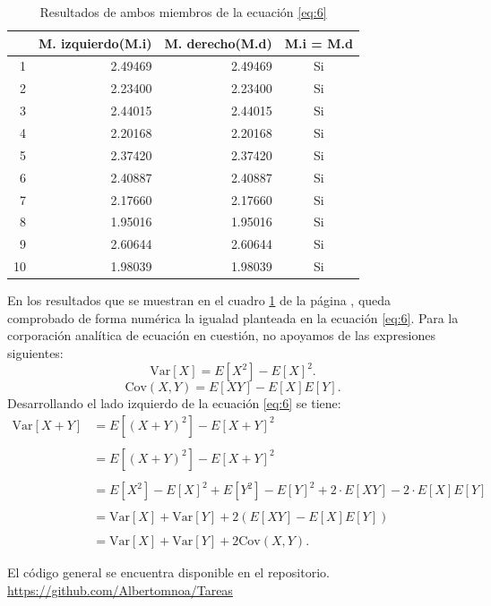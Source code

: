 \documentclass{article}
\begin{document}
\begin{table}[H]
  \centering
  \caption{Resultados de ambos miembros de la ecuación \ref{eq:6}}
    \begin{tabular}{rrrc}
    \toprule
          & \multicolumn{1}{l}{M. izquierdo(M.i)} & \multicolumn{1}{l}{M. derecho(M.d)} & \multicolumn{1}{l}{M.i  =  M.d} \\
    \midrule
    1     & 2.49469 & 2.49469 & Si \\
    2     & 2.23400 & 2.23400 & Si \\
    3     & 2.44015 & 2.44015 & Si \\
    4     & 2.20168 & 2.20168 & Si \\
    5     & 2.37420 & 2.37420 & Si \\
    6     & 2.40887 & 2.40887 & Si \\
    7     & 2.17660 & 2.17660 & Si \\
    8     & 1.95016 & 1.95016 & Si \\
    9     & 2.60644 & 2.60644 & Si \\
    10    & 1.98039 & 1.98039 & Si \\
    \bottomrule
    \end{tabular}%
  \label{tab:3}%
\end{table}%
En los resultados que se muestran en el cuadro \ref{tab:3} de la página \pageref{tab:3}, queda comprobado de forma numérica la igualad planteada en la ecuación \ref{eq:6}. Para la corporación analítica de ecuación en cuestión, no apoyamos de las expresiones siguientes:
\begin{equation}
 \text{Var}[X]= E[X^{2}] - E[X]^{2}.  
\end{equation}
\begin{equation}
 \text{Cov}(X,Y)= E[XY] - E[X]E[Y].  
\end{equation}
 Desarrollando el lado izquierdo de la ecuación \ref{eq:6} se tiene:
 \begin{equation}
     \begin{array}{cl}
       \text{Var}[X + Y]    & = E[(X+Y)^{2}] - E[X+Y]^{2} \\
                            &  \\
                            & = E[(X+Y)^{2}] - E[X+Y]^{2} \\
                            &  \\
                            & = E[X^{2}]- E[X]^{2} + E[Y^{2}]- E[Y]^{2} + 2\cdot E[XY]  - 2\cdot E[X]E[Y]  \\ 
                            &  \\
                            & = \text{Var}[X] + \text{Var}[Y] + 2 ( E[XY]- E[X]E[Y])\\ 
                            &  \\
                            & = \text{Var}[X] + \text{Var}[Y] +2\text{Cov}(X,Y).
     \end{array}
 \end{equation}
 
 El código general se encuentra disponible en el repositorio. \href{https://github.com/Albertomnoa/Tareas_MPA/tree/master/Tarea10}{https://github.com/Albertomnoa/Tareas} \textbf{} 

   
\newpage


\end{document}
